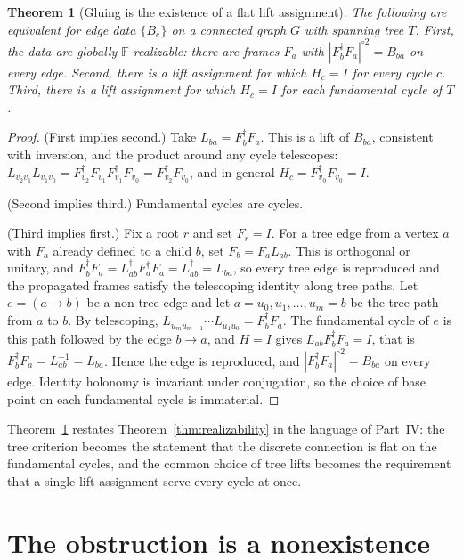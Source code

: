 \documentclass[11pt,oneside]{book}
\newtheorem{theorem}{Theorem}[chapter]
\theoremstyle{definition}
\theoremstyle{remark}
\begin{document}
\begin{theorem}[Gluing is the existence of a flat lift assignment]\label{thm:flat}
The following are equivalent for edge data $\{B_e\}$ on a connected graph $G$ with spanning tree $T$. First, the data are globally $\mathbb F$-realizable: there are frames $F_a$ with $|F_b^{\dagger}F_a|^{\circ2}=B_{ba}$ on every edge. Second, there is a lift assignment for which $H_c=I$ for every cycle $c$. Third, there is a lift assignment for which $H_c=I$ for each fundamental cycle of $T$.
\end{theorem}

\begin{proof}
(First implies second.) Take $L_{ba}=F_b^{\dagger}F_a$. This is a lift of $B_{ba}$, consistent with inversion, and the product around any cycle telescopes: $L_{v_2v_1}L_{v_1v_0}=F_{v_2}^{\dagger}F_{v_1}F_{v_1}^{\dagger}F_{v_0}=F_{v_2}^{\dagger}F_{v_0}$, and in general $H_c=F_{v_0}^{\dagger}F_{v_0}=I$.

(Second implies third.) Fundamental cycles are cycles.

(Third implies first.) Fix a root $r$ and set $F_r=I$. For a tree edge from a vertex $a$ with $F_a$ already defined to a child $b$, set $F_b=F_aL_{ab}$. This is orthogonal or unitary, and $F_b^{\dagger}F_a=L_{ab}^{\dagger}F_a^{\dagger}F_a=L_{ab}^{\dagger}=L_{ba}$, so every tree edge is reproduced and the propagated frames satisfy the telescoping identity along tree paths. Let $e=(a\to b)$ be a non-tree edge and let $a=u_0,u_1,\dots,u_m=b$ be the tree path from $a$ to $b$. By telescoping, $L_{u_mu_{m-1}}\cdots L_{u_1u_0}=F_b^{\dagger}F_a$. The fundamental cycle of $e$ is this path followed by the edge $b\to a$, and $H=I$ gives $L_{ab}F_b^{\dagger}F_a=I$, that is $F_b^{\dagger}F_a=L_{ab}^{-1}=L_{ba}$. Hence the edge is reproduced, and $|F_b^{\dagger}F_a|^{\circ2}=B_{ba}$ on every edge. Identity holonomy is invariant under conjugation, so the choice of base point on each fundamental cycle is immaterial.
\end{proof}

Theorem~\ref{thm:flat} restates Theorem~\ref{thm:realizability} in the language of Part~IV: the tree criterion becomes the statement that the discrete connection is flat on the fundamental cycles, and the common choice of tree lifts becomes the requirement that a single lift assignment serve every cycle at once.

\section*{The obstruction is a nonexistence}
\end{document}
